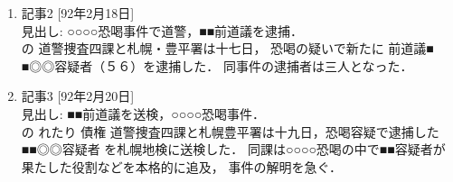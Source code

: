 \begin{enumerate}
\item 記事2 [92年2月18日]
\\ 
見出し: ○○○○恐喝事件で道警，■■前道議を逮捕．
\\ 
\shadedbox
      {の}
      道警捜査四課と札幌・豊平署は十七日，
      恐喝の疑いで新たに
      前道議■
      ■◎◎容疑者（５６）を逮捕した．
同事件の逮捕者は三人となった．
\item 記事3 [92年2月20日]
\\ 
見出し: ■■前道議を送検，○○○○恐喝事件．
\\ 
\shadedbox
      {の}
      \shadedbox
      {れたり}\shadedbox
      {債権}
      道警捜査四課と札幌豊平署は十九日，恐喝容疑で逮捕した
      ■■◎◎容疑者
      を札幌地検に送検した．
      同課は○○○○恐喝の中で■■容疑者が果たした役割などを本格的に追及，
      事件の解明を急ぐ．


\end{enumerate}
